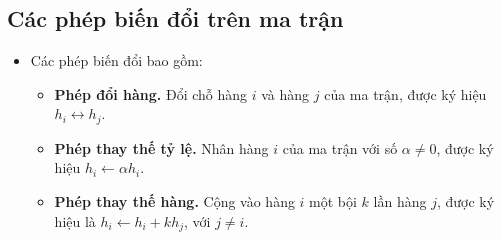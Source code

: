 \documentclass[12pt,a4paper]{report}
\begin{document}
\begin{itemize}
\end{itemize}

\subsection{Các phép biến đổi trên ma trận}
\begin{itemize}
\item Các phép biến đổi bao gồm:
\begin{itemize}
\item \textbf{Phép đổi hàng.} Đổi chỗ hàng $i$ và hàng $j$ của ma trận, được ký hiệu $h_i \leftrightarrow h_j$.
\item \textbf{Phép thay thế tỷ lệ.} Nhân hàng $i$ của ma trận với số $\alpha \neq 0$, được ký hiệu $h_i \leftarrow \alpha h_i$.
\item \textbf{Phép thay thế hàng.} Cộng vào hàng $i$ một bội $k$ lần hàng $j$, được ký hiệu là $h_i \leftarrow h_i + k h_j$, với $j \neq i$.
\end{itemize}
\end{itemize}
\end{document}
